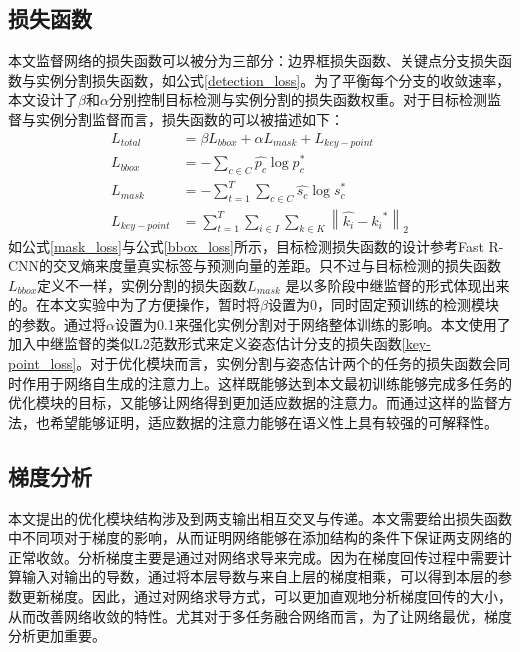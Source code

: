 \subsection{损失函数}
\label{subsec:lossfunction}

本文监督网络的损失函数可以被分为三部分：边界框损失函数、关键点分支损失函数与实例分割损失函数，如公式\eqref{detection_loss}。为了平衡每个分支的收敛速率，本文设计了$\beta$和$\alpha$分别控制目标检测与实例分割的损失函数权重。对于目标检测监督与实例分割监督而言，损失函数的可以被描述如下：
\begin{align}
L_{total} &= \beta L_{bbox} + \alpha L_{mask} + L_{key-point}\label{detection_loss}\\
L_{bbox} &= -\sum_{c \in C}{\hat{p_c} \log{p_c^{*}}}\label{bbox_loss}\\
L_{mask} &= -\sum_{t=1}^{T}\sum_{c \in C}{\hat{s_c} \log{s_c^{*}}}\label{mask_loss}\\
L_{key-point} &= \sum_{t=1}^{T}\sum_{i \in I}\sum_{k \in K}{\left\| \hat{k_i} - {k_i}^{*} \right\|_2}\label{key-point_loss}
\end{align}
如公式\eqref{mask_loss}与公式\eqref{bbox_loss}所示，目标检测损失函数的设计参考Fast R-CNN\cite{Girshick2015Fast}的交叉熵来度量真实标签与预测向量的差距。只不过与目标检测的损失函数$L_{bbox}$定义不一样，实例分割的损失函数$L_{mask}$ 是以多阶段中继监督的形式体现出来的。在本文实验中为了方便操作，暂时将$\beta$设置为0，同时固定预训练的检测模块的参数。通过将$\alpha$设置为0.1来强化实例分割对于网络整体训练的影响。本文使用了加入中继监督的类似L2范数形式来定义姿态估计分支的损失函数\eqref{key-point_loss}。对于优化模块而言，实例分割与姿态估计两个的任务的损失函数会同时作用于网络自生成的注意力上。这样既能够达到本文最初训练能够完成多任务的优化模块的目标，又能够让网络得到更加适应数据的注意力。而通过这样的监督方法，也希望能够证明，适应数据的注意力能够在语义性上具有较强的可解释性。



\subsection{梯度分析}
\label{subsec:gradient}
本文提出的优化模块结构涉及到两支输出相互交叉与传递。本文需要给出损失函数中不同项对于梯度的影响，从而证明网络能够在添加结构的条件下保证两支网络的正常收敛。分析梯度主要是通过对网络求导来完成。因为在梯度回传过程中需要计算输入对输出的导数，通过将本层导数与来自上层的梯度相乘，可以得到本层的参数更新梯度。因此，通过对网络求导方式，可以更加直观地分析梯度回传的大小，从而改善网络收敛的特性。尤其对于多任务融合网络而言，为了让网络最优，梯度分析更加重要。

